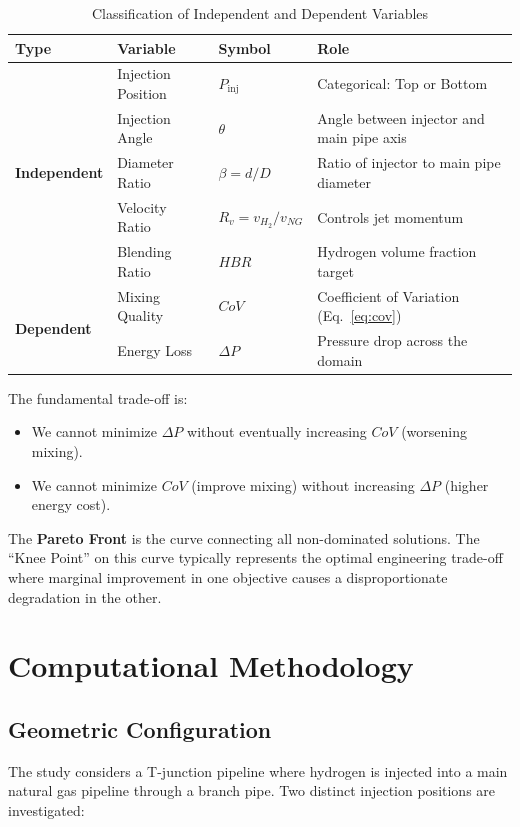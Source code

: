 \documentclass[12pt, a4paper]{report}
\begin{document}
\begin{table}[H]
\centering
\caption{Classification of Independent and Dependent Variables}
\label{tab:var_class}
\begin{tabular}{@{}lllp{5.5cm}@{}}
\toprule
\textbf{Type} & \textbf{Variable} & \textbf{Symbol} & \textbf{Role} \\ \midrule
\multirow{5}{*}{\textbf{Independent}} 
    & Injection Position & $P_{\text{inj}}$ & Categorical: Top or Bottom \\
    & Injection Angle & $\theta$ & Angle between injector and main pipe axis \\
    & Diameter Ratio & $\beta = d/D$ & Ratio of injector to main pipe diameter \\
    & Velocity Ratio & $R_v = v_{H_2}/v_{NG}$ & Controls jet momentum \\
    & Blending Ratio & $HBR$ & Hydrogen volume fraction target \\ \midrule
\multirow{2}{*}{\textbf{Dependent}} 
    & Mixing Quality & $CoV$ & Coefficient of Variation (Eq.~\ref{eq:cov}) \\
    & Energy Loss & $\Delta P$ & Pressure drop across the domain \\ \bottomrule
\end{tabular}
\end{table}

\noindent The fundamental trade-off is:
\begin{itemize}
    \item We cannot minimize $\Delta P$ without eventually increasing $CoV$ (worsening mixing).
    \item We cannot minimize $CoV$ (improve mixing) without increasing $\Delta P$ (higher energy cost).
\end{itemize}
The \textbf{Pareto Front} is the curve connecting all non-dominated solutions. The ``Knee Point'' on this curve typically represents the optimal engineering trade-off where marginal improvement in one objective causes a disproportionate degradation in the other.

\chapter{Computational Methodology}

\section{Geometric Configuration}
The study considers a T-junction pipeline where hydrogen is injected into a main natural gas pipeline through a branch pipe. Two distinct injection positions are investigated:
\end{document}
